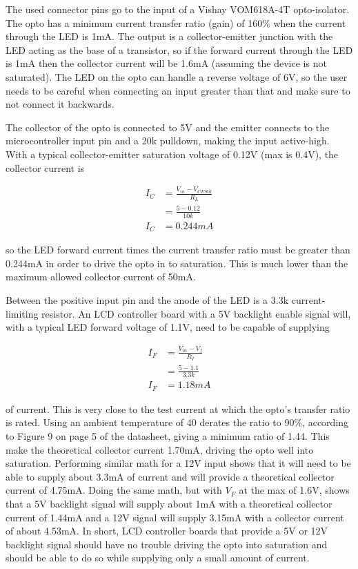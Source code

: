 \documentclass{article}
\begin{document}
The used connector pins go to the input of a Vishay VOM618A-4T opto-isolator. The opto has a minimum
current transfer ratio (gain) of 160\% when the current through the LED is 1mA.  The output is a
collector-emitter junction with the LED acting as the base of a transistor, so if the forward
current through the LED is 1mA then the collector current will be 1.6mA (assuming the device is not
saturated).  The LED on the opto can handle a reverse voltage of 6V, so the user needs to be careful
when connecting an input greater than that and make sure to not connect it backwards.

The collector of the opto is connected to 5V and the emitter connects to the microcontroller input
pin and a 20k\textOmega{} pulldown, making the input active-high.  With a typical collector-emitter
saturation voltage of 0.12V (max is 0.4V), the collector current is

\begin{align*}
    I_C &= \frac{V_{in} - V_{CESat}}{R_L} \\
    &= \frac{5 - 0.12}{10k} \\
    I_C &= 0.244mA
\end{align*}

so the LED forward current times the current transfer ratio must be greater than 0.244mA in order to
drive the opto in to saturation.  This is much lower than the maximum allowed collector current of
50mA.

Between the positive input pin and the anode of the LED is a 3.3k\textOmega{} current-limiting
resistor.  An LCD controller board with a 5V backlight enable signal will, with a typical LED
forward voltage of 1.1V, need to be capable of supplying

\begin{align*}
    I_F &= \frac{V_{in} - V_f}{R_I} \\
    &= \frac{5 - 1.1}{3.3k} \\
    I_F &= 1.18mA
\end{align*}

of current.  This is very close to the test current at which the opto's transfer ratio is rated.
Using an ambient temperature of 40\textcelsius{} derates the ratio to 90\%, according to Figure 9 on
page 5 of the datasheet, giving a minimum ratio of 1.44.  This make the theoretical collector
current 1.70mA, driving the opto well into saturation.  Performing similar math for a 12V input
shows that it will need to be able to supply about 3.3mA of current and will provide a theoretical
collector current of 4.75mA.  Doing the same math, but with $V_F$ at the max of 1.6V, shows that a
5V backlight signal will supply about 1mA with a theoretical collector current of 1.44mA and a 12V
signal will supply 3.15mA with a collector current of about 4.53mA.  In short, LCD controller boards
that provide a 5V or 12V backlight signal should have no trouble driving the opto into saturation
and should be able to do so while supplying only a small amount of current.
\end{document}

